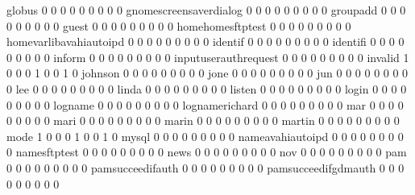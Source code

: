 \documentclass[compress,8pt]{beamer}
\begin{document}
\begin{frame}
\begin{Schunk}
  globus                                     0   0   0   0   0   0   0   0   0
  gnomescreensaverdialog                     0   0   0   0   0   0   0   0   0
  groupadd                                   0   0   0   0   0   0   0   0   0
  guest                                      0   0   0   0   0   0   0   0   0
  homehomesftptest                           0   0   0   0   0   0   0   0   0
  homevarlibavahiautoipd                     0   0   0   0   0   0   0   0   0
  identif                                    0   0   0   0   0   0   0   0   0
  identifi                                   0   0   0   0   0   0   0   0   0
  inform                                     0   0   0   0   0   0   0   0   0
  inputuserauthrequest                       0   0   0   0   0   0   0   0   0
  invalid                                    1   0   0   0   1   0   0   1   0
  johnson                                    0   0   0   0   0   0   0   0   0
  jone                                       0   0   0   0   0   0   0   0   0
  jun                                        0   0   0   0   0   0   0   0   0
  lee                                        0   0   0   0   0   0   0   0   0
  linda                                      0   0   0   0   0   0   0   0   0
  listen                                     0   0   0   0   0   0   0   0   0
  login                                      0   0   0   0   0   0   0   0   0
  logname                                    0   0   0   0   0   0   0   0   0
  lognamerichard                             0   0   0   0   0   0   0   0   0
  mar                                        0   0   0   0   0   0   0   0   0
  mari                                       0   0   0   0   0   0   0   0   0
  marin                                      0   0   0   0   0   0   0   0   0
  martin                                     0   0   0   0   0   0   0   0   0
  mode                                       1   0   0   0   1   0   0   1   0
  mysql                                      0   0   0   0   0   0   0   0   0
  nameavahiautoipd                           0   0   0   0   0   0   0   0   0
  namesftptest                               0   0   0   0   0   0   0   0   0
  news                                       0   0   0   0   0   0   0   0   0
  nov                                        0   0   0   0   0   0   0   0   0
  pam                                        0   0   0   0   0   0   0   0   0
  pamsucceedifauth                           0   0   0   0   0   0   0   0   0
  pamsucceedifgdmauth                        0   0   0   0   0   0   0   0   0

\end{Schunk}
\end{frame}
\end{document}

